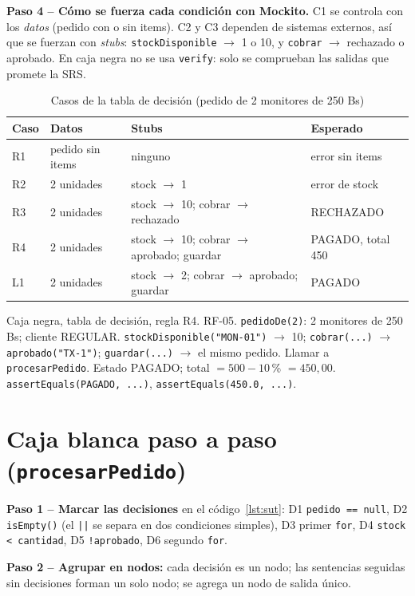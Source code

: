 \documentclass[11pt,a4paper,oneside]{report}
\newcommand{\code}[1]{\texttt{#1}}
\begin{document}
\textbf{Paso 4 -- Cómo se fuerza cada condición con Mockito.} C1 se controla con los \emph{datos} (pedido con o sin items). C2 y C3 dependen de sistemas externos, así que se fuerzan con \emph{stubs}: \code{stockDisponible} $\rightarrow$ 1 o 10, y \code{cobrar} $\rightarrow$ rechazado o aprobado. En caja negra no se usa \code{verify}: solo se comprueban las salidas que promete la SRS.

\begin{table}[H]
\centering
\caption{Casos de la tabla de decisión (pedido de 2 monitores de 250 Bs)}
\small
\begin{tabular}{llll}
\toprule
\textbf{Caso} & \textbf{Datos} & \textbf{Stubs} & \textbf{Esperado}\\
\midrule
R1 & pedido sin items & ninguno & error sin items\\
R2 & 2 unidades & stock $\rightarrow$ 1 & error de stock\\
R3 & 2 unidades & stock $\rightarrow$ 10; cobrar $\rightarrow$ rechazado & RECHAZADO\\
R4 & 2 unidades & stock $\rightarrow$ 10; cobrar $\rightarrow$ aprobado; guardar & PAGADO, total 450\\
L1 & 2 unidades & stock $\rightarrow$ 2; cobrar $\rightarrow$ aprobado; guardar & PAGADO\\
\bottomrule
\end{tabular}
\end{table}

{Caja negra, tabla de decisión, regla R4. RF-05.}
{\code{pedidoDe(2)}: 2 monitores de 250 Bs; cliente REGULAR.}
{\code{stockDisponible("MON-01")} $\rightarrow$ 10; \code{cobrar(...)} $\rightarrow$ \code{aprobado("TX-1")}; \code{guardar(...)} $\rightarrow$ el mismo pedido.}
{Llamar a \code{procesarPedido}.}
{Estado PAGADO; total $= 500 - 10$\,\% $= 450{,}00$.}
{\code{assertEquals(PAGADO, ...)}, \code{assertEquals(450.0, ...)}.}

\section{Caja blanca paso a paso (\code{procesarPedido})}
\textbf{Paso 1 -- Marcar las decisiones} en el código~\ref{lst:sut}: D1 \code{pedido == null}, D2 \code{isEmpty()} (el \code{||} se separa en dos condiciones simples), D3 primer \code{for}, D4 \code{stock < cantidad}, D5 \code{!aprobado}, D6 segundo \code{for}.

\textbf{Paso 2 -- Agrupar en nodos:} cada decisión es un nodo; las sentencias seguidas sin decisiones forman un solo nodo; se agrega un nodo de salida único.
\end{document}
